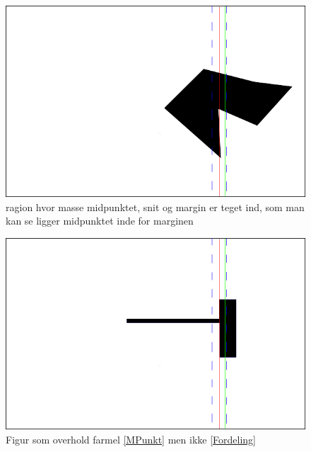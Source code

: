 {\begin{figure}[h]
	\begin{center}
		\includegraphics[scale=0.5,angle=0]{afsnit/vores_implementation/billeder/udvidet_loesning/cOMCutMargin.png}
	\end{center}
	\caption[]{ragion hvor masse midpunktet, snit og margin er teget ind, som man kan se ligger midpunktet inde for marginen}
	\label{cOMCutMargin}
\end{figure}


\begin{figure}[h]
	\begin{center}
		\includegraphics[scale=0.5,angle=0]{afsnit/vores_implementation/billeder/udvidet_loesning/dontWork.png}
	\end{center}
	\caption[]{Figur som overhold farmel \ref{MPunkt} men ikke \ref{Fordeling}}
	\label{dontwork}
\end{figure}

}
